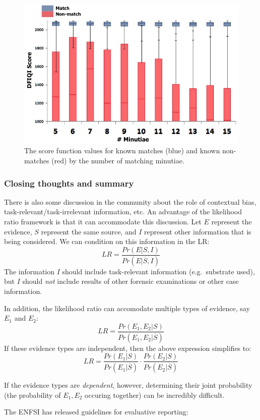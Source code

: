 \documentclass[]{book}
\theoremstyle{definition}
\theoremstyle{definition}
\theoremstyle{remark}
\begin{document}
\begin{figure}

{\centering \includegraphics[width=.5\linewidth]{img/dfscscore} 

}

\caption{The score function values for known matches (blue) and known non-matches (red) by the number of matching minutiae.}\label{fig:minutiae}
\end{figure}

\subsubsection{Closing thoughts and
summary}\label{closing-thoughts-and-summary}

There is also some discussion in the community about the role of
contextual bias, task-relevant/task-irrelevant information, etc. An
advantage of the likelihood ratio framework is that it can accommodate
this discussion. Let \(E\) represent the evidence, \(S\) represent the
same source, and \(I\) represent other information that is being
considered. We can condition on this information in the LR:
\[LR = \frac{Pr(E|S,I)}{Pr(E|\overline{S},I)}\] The information \(I\)
should include task-relevant information (e.g.~substrate used), but
\(I\) should \emph{not} include results of other forensic examinations
or other case information.

In addition, the likelihood ratio can accomodate multiple types of
evidence, say \(E_1\) and \(E_2\):
\[LR = \frac{Pr(E_1,E_2|S)}{Pr(E_1, E_2|\overline{S})}\] If these
evidence types are independent, then the above expression simplifies to:
\[LR = \frac{Pr(E_1|S)}{Pr(E_1|\overline{S})}\cdot \frac{Pr(E_2|S)}{Pr(E_2|\overline{S})}\]

If the evidence types are \emph{dependent}, however, determining their
joint probability (the probability of \(E_1,E_2\) occuring together) can
be incredibly difficult.

The ENFSI has released guidelines for evaluative reporting:
\end{document}
